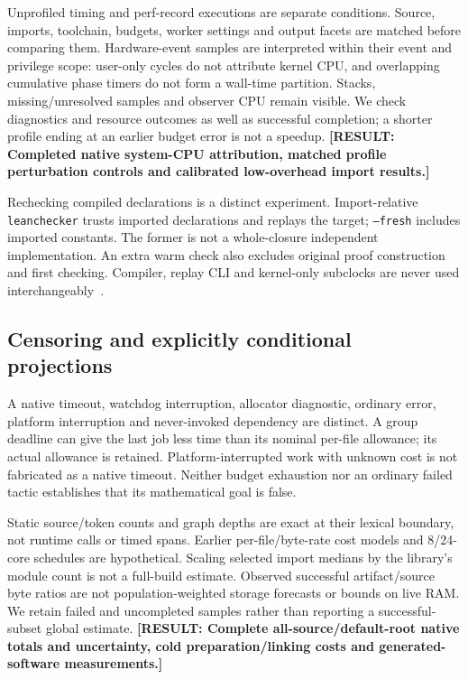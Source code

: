 \documentclass[10pt,twocolumn]{article}
\newcommand{\missing}[1]{\textbf{[RESULT: #1]}}
\begin{document}
Unprofiled timing and perf-record executions are separate conditions.
Source, imports, toolchain, budgets, worker settings and output facets are
matched before comparing them.
Hardware-event samples are interpreted within their event and privilege
scope: user-only cycles do not attribute kernel CPU, and overlapping
cumulative phase timers do not form a wall-time partition.
Stacks, missing/unresolved samples and observer CPU remain visible.
We check diagnostics and resource outcomes as well as successful completion;
a shorter profile ending at an earlier budget error is not a speedup.
\missing{Completed native system-CPU attribution, matched profile
perturbation controls and calibrated low-overhead import results.}

Rechecking compiled declarations is a distinct experiment.
Import-relative \texttt{leanchecker} trusts imported declarations and replays
the target; \texttt{--fresh} includes imported constants.
The former is not a whole-closure independent implementation.
An extra warm check also excludes original proof construction and first
checking. Compiler, replay CLI and kernel-only subclocks are never used
interchangeably~\cite{leanCheckerDocs,lean4lean2025}.

\subsection{Censoring and explicitly conditional projections}
A native timeout, watchdog interruption, allocator diagnostic, ordinary
error, platform interruption and never-invoked dependency are distinct.
A group deadline can give the last job less time than its nominal per-file
allowance; its actual allowance is retained.
Platform-interrupted work with unknown cost is not fabricated as a
native timeout. Neither budget exhaustion nor an ordinary failed tactic
establishes that its mathematical goal is false.

Static source/token counts and graph depths are exact at their lexical
boundary, not runtime calls or timed spans.
Earlier per-file/byte-rate cost models and 8/24-core schedules are
hypothetical. Scaling selected import medians by the library's module
count is not a full-build estimate.
Observed successful artifact/source byte ratios are not population-weighted
storage forecasts or bounds on live RAM.
We retain failed and uncompleted samples rather than reporting a
successful-subset global estimate.
\missing{Complete all-source/default-root native totals and uncertainty,
cold preparation/linking costs and generated-software measurements.}
\end{document}
